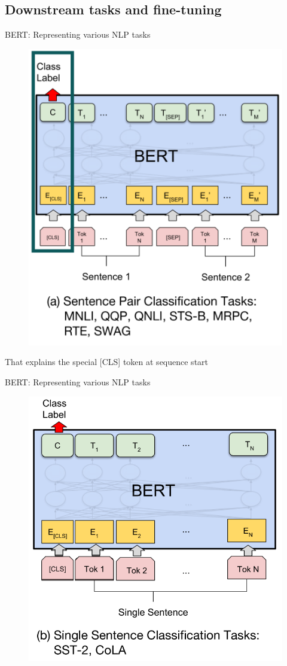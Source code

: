 \documentclass[12pt,aspectratio=169,handout]{beamer}
\begin{document}
\subsection{Downstream tasks and fine-tuning}

\begin{frame}{BERT: Representing various NLP tasks}
	
	\begin{figure}
		\includegraphics[width=0.5\linewidth]{img/task1.png}
	\end{figure}
	
	That explains the special [CLS] token at sequence start
	
\end{frame}



\begin{frame}{BERT: Representing various NLP tasks}
	
	\begin{figure}
		\includegraphics[width=0.6\linewidth]{img/task2.png}
	\end{figure}
	
	
\end{frame}
\end{document}
